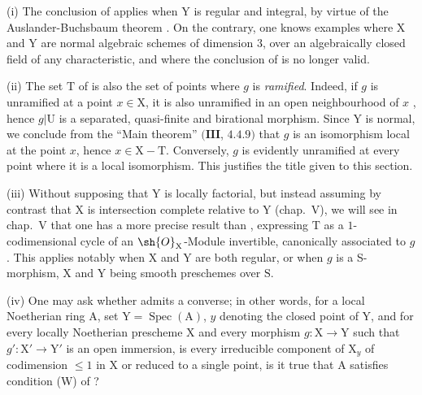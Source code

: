 \begin{remarks}[21.12.14]
\label{IV.21.12.14}
(i)
The conclusion of  applies when $\mathrm{Y}$ is regular and integral, by virtue of the Auslander-Buchsbaum theorem .
On the contrary, one knows examples where $\mathrm{X}$ and $\mathrm{Y}$ are normal algebraic schemes of dimension $3$, over an algebraically closed field of any characteristic, and where the conclusion of  is no longer valid.

(ii)
The set $\mathrm{T}$ of  is also the set of points where $g$ is \emph{ramified}.
Indeed, if $g$ is unramified at a point $x\in\mathrm{X}$, it is also unramified in an open neighbourhood of $x$ , hence $g|\mathrm{U}$ is a separated, quasi-finite and birational morphism.
Since $\mathrm{Y}$ is normal, we conclude from the ``Main theorem'' $(\mathbf{III}$, $4.4.9)$ that $g$ is an isomorphism local at the point $x$, hence $x\in\mathrm{X}-\mathrm{T}$.
Conversely, $g$ is evidently unramified at every point where it is a local isomorphism.
This justifies the title given to this section.

(iii)
Without supposing that $\mathrm{Y}$ is locally factorial, but instead assuming by contrast that $\mathrm{X}$ is intersection complete relative to $\mathrm{Y}$ (chap.~V), we will see in chap.~V that one has a more precise result than , expressing $\mathrm{T}$ as a $1$-codimensional cycle of an $\sh{O}_{\mathrm{X}}$-Module invertible, canonically associated to $g$.
This applies notably when $\mathrm{X}$ and $\mathrm{Y}$ are both regular, or when $g$ is a S-morphism, $\mathrm{X}$ and $\mathrm{Y}$ being smooth preschemes over $\mathrm{S}$.

(iv) One may ask whether  admits a converse; in other words, for a local Noetherian ring $\mathrm{A}$, set $\mathrm{Y}=\operatorname{Spec}(\mathrm{A})$, $y$ denoting the closed point of $\mathrm{Y}$, and for every locally Noetherian prescheme $\mathrm{X}$ and every morphism $g:\mathrm{X}\to\mathrm{Y}$ such that $g':\mathrm{X}'\to\mathrm{Y}'$ is an open immersion, is every irreducible component of $\mathrm{X}_y$ of codimension $\leq 1$ in $\mathrm{X}$ or reduced to a single point, is it true that $\mathrm{A}$ satisfies condition (W) of ?


\end{remarks}
